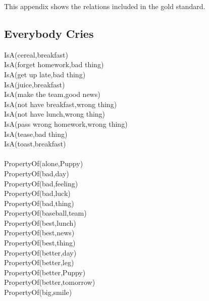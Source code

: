 %
%
%                 

\label{sec:appendixgoldrel}

This appendix shows the relations included in the gold standard.

\subsection{Everybody Cries}

\begin{multicols}{2}
\begin{footnotesize}
\noindent
IsA(cereal,breakfast) \\
IsA(forget homework,bad thing) \\
IsA(get up late,bad thing) \\
IsA(juice,breakfast) \\
IsA(make the team,good news) \\
IsA(not have breakfast,wrong thing) \\
IsA(not have lunch,wrong thing) \\
IsA(pass wrong homework,wrong thing) \\
IsA(tease,bad thing) \\
IsA(toast,breakfast) \\
~\\
PropertyOf(alone,Puppy) \\
PropertyOf(bad,day) \\
PropertyOf(bad,feeling) \\
PropertyOf(bad,luck) \\
PropertyOf(bad,thing) \\
PropertyOf(baseball,team) \\
PropertyOf(best,lunch) \\
PropertyOf(best,news) \\
PropertyOf(best,thing) \\
PropertyOf(better,day) \\
PropertyOf(better,leg) \\
PropertyOf(better,Puppy) \\
PropertyOf(better,tomorrow) \\
PropertyOf(big,smile) \\

\end{footnotesize}
\end{multicols}
